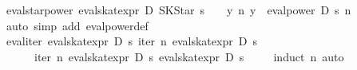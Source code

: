 \begin{isabellebody}
\isanewline
{}\isamarkupfalse%
\ eval{}star{}power{}\ {}eval{}skat{}expr\ D\ {}SKStar\ s{}\ {}\ {}\ {}\ {}y{}\ {}n{}\ y\ {}\ eval{}power\ D\ s\ n\ {}{}{}\isanewline
%
\isadelimproof
\ \ %
\endisadelimproof
%
\isatagproof
{}\isamarkupfalse%
\ {}auto\ simp\ add{}\ eval{}power{}def{}%
\endisatagproof
{\isafoldproof}%
%
\isadelimproof
\isanewline
%
\endisadelimproof
\isanewline
{}\isamarkupfalse%
\ eval{}iter{}{}\ {}eval{}skat{}expr\ D\ s\ {}iter\ n\ {}eval{}skat{}expr\ D\ s{}\ {}{}\isanewline
\ \ \ \ \ {}\ iter\ n\ {}eval{}skat{}expr\ D\ s{}\ {}eval{}skat{}expr\ D\ s\ {}{}{}\isanewline
%
\isadelimproof
\ \ %
\endisadelimproof
%
\isatagproof
{}\isamarkupfalse%
\ {}induct\ n{}\ auto{}%
\endisatagproof
{\isafoldproof}%
%
\isadelimproof

\end{isabellebody}
